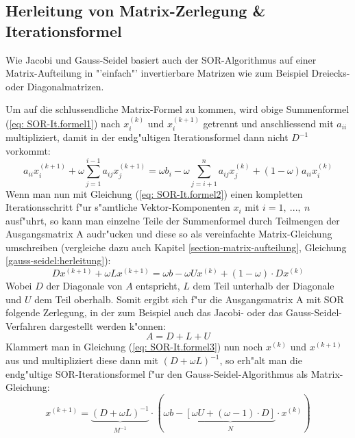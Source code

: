 \begin{refsection}
\subsection{Herleitung von Matrix-Zerlegung \& Iterationsformel \label{subsec: SOR-Herleitung}}
Wie Jacobi und Gauss-Seidel basiert auch der SOR-Algorithmus auf einer
Matrix-Aufteilung in "'einfach"' invertierbare Matrizen wie zum Beispiel
Dreiecks- oder Diagonalmatrizen.

Um auf die schlussendliche Matrix-Formel zu kommen, wird obige
Summenformel (\ref{eq: SOR-It.formel1}) nach $x_i^{(k)}$ und $x_i^{(k+1)}$
getrennt und anschliessend mit $a_{ii}$ multipliziert, damit in der
endg"ultigen Iterationsformel dann nicht $D^{-1}$ vorkommt:
\begin{equation} \label{eq: SOR-It.formel2}
	a_{ii}x_i^{(k+1)} %
	+\omega %
	\sum\limits_{j=1}^{i-1} a_{ij}x_j^{(k+1)} %
 = \omega b_i- \omega %
 \sum\limits_{j=i+1}^n a_{ij}x_j^{(k)} %
 +(1-\omega)	%
	a_{ii}x_i^{(k)} %
\end{equation}
Wenn man nun mit Gleichung (\ref{eq: SOR-It.formel2}) einen kompletten
Iterationsschritt f"ur s"amtliche Vektor-Komponenten $x_i$ mit $i=1,\
...,\ n$ ausf"uhrt, so kann man einzelne Teile der Summenformel
durch Teilmengen der Ausgangsmatrix A audr"ucken und diese so als
vereinfachte Matrix-Gleichung umschreiben (vergleiche dazu auch Kapitel
\ref{section-matrix-aufteilung}, Gleichung \ref{gauss-seidel:herleitung}):
\begin{equation} \label{eq: SOR-It.formel3}
Dx^{(k+1)}+\omega Lx^{(k+1)}=\omega b-\omega Ux^{(k)}+(1-\omega)\cdot Dx^{(k)}
\end{equation}
Wobei $D$ der Diagonale von $A$ entspricht, $L$ dem Teil unterhalb
der Diagonale und $U$ dem Teil oberhalb. Somit ergibt sich f"ur die
Ausgangsmatrix A mit SOR folgende Zerlegung, in der zum Beispiel auch
das Jacobi- oder das Gauss-Seidel-Verfahren dargestellt werden k"onnen:
\begin{equation} \label{eq: SOR Matrix-Splitting}
A=D+L+U
\end{equation}
Klammert man in Gleichung (\ref{eq: SOR-It.formel3}) nun noch $x^{(k)}$
und $x^{(k+1)}$ aus und multipliziert diese dann mit $(D+\omega
L)^{-1}$, so erh"alt man die endg"ultige SOR-Iterationsformel f"ur den
Gauss-Seidel-Algorithmus als Matrix-Gleichung:
\begin{equation} \label{eq: SOR-It.formel}
x^{(k+1)}=\underbrace{(D+\omega L)^{-1}}_{\substack{M^{-1}}}\cdot(\omega b-\underbrace{[\omega U+(\omega-1)\cdot D]}_{\substack{N}}\cdot x^{(k)})
\end{equation}
		

\end{refsection}
